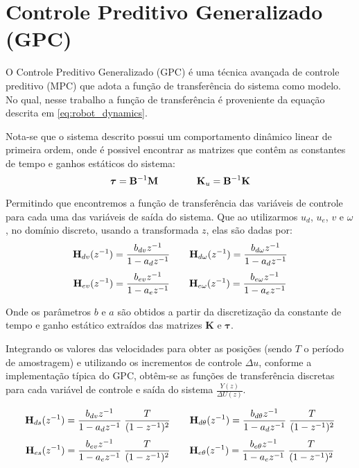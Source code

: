 \section{Controle Preditivo Generalizado (GPC)}

O Controle Preditivo Generalizado (GPC) é uma 
técnica avançada de controle preditivo (MPC) 
que adota a função de transferência do sistema 
como modelo. No qual, nesse trabalho a função de transferência é proveniente 
da equação descrita em \ref{eq:robot_dynamics}.

\vspace{1em}
Nota-se que o sistema descrito possui um comportamento dinâmico linear de
primeira ordem, onde é possivel encontrar as matrizes que contêm 
as constantes de tempo e ganhos estáticos do sistema:
\begin{equation}
\boldsymbol{\tau} = \mathbf{B}^{-1} \mathbf{M} \\
\qquad
\qquad
\mathbf{K}_u = \mathbf{B}^{-1} \mathbf{K}
\end{equation}

Permitindo que encontremos a função de transferência das variáveis 
de controle para cada uma das variáveis de saída do sistema. 
Que ao utilizarmos $u_d$, $u_e$, $v$ e $\omega$,
no domínio discreto, usando a transformada $z$, elas são dadas por:
\[
\mathbf{H}_{d v}(z^{-1}) = \frac{b_{d v} z^{-1}}{1 - a_{d} z^{-1}} \\
\qquad
\mathbf{H}_{d \omega}(z^{-1}) = \frac{b_{d \omega} z^{-1}}{1 - a_{d} z^{-1}} \\
\]
\[
\mathbf{H}_{e v}(z^{-1}) = \frac{b_{e v} z^{-1}}{1 - a_{e} z^{-1}} \\
\qquad
\mathbf{H}_{e \omega}(z^{-1}) = \frac{b_{e \omega} z^{-1}}{1 - a_{e} z^{-1}}
\]

Onde os parâmetros $b$ e $a$ são obtidos a partir da discretização 
da constante de tempo e ganho estático extraídos das matrizes
$\mathbf{K}$ e $\boldsymbol{\tau}$.

\vspace{1em}
Integrando os valores das velocidades para obter as posições 
(sendo $T$ o período de amostragem) e utilizando os incrementos 
de controle $\Delta u$, conforme a implementação típica do GPC, 
obtêm-se as funções de transferência discretas para cada variável 
de controle e saída do sistema $\frac{Y(z)}{\Delta U(z)}$.

\[
\mathbf{H}_{d s}(z^{-1}) = \frac{b_{d v} z^{-1}}{1 - a_{d} z^{-1}} \; \frac{T}{(1 - z^{-1})^2}\\
\qquad
\mathbf{H}_{d \theta}(z^{-1}) = \frac{b_{d \theta} z^{-1}}{1 - a_{d} z^{-1}} \; \frac{T}{(1 - z^{-1})^2}\\
\]
\[
\mathbf{H}_{e s}(z^{-1}) = \frac{b_{e v} z^{-1}}{1 - a_{e} z^{-1}} \; \frac{T}{(1 - z^{-1})^2}\\
\qquad
\mathbf{H}_{e \theta}(z^{-1}) = \frac{b_{e \theta} z^{-1}}{1 - a_{e} z^{-1}} \; \frac{T}{(1 - z^{-1})^2}
\]

